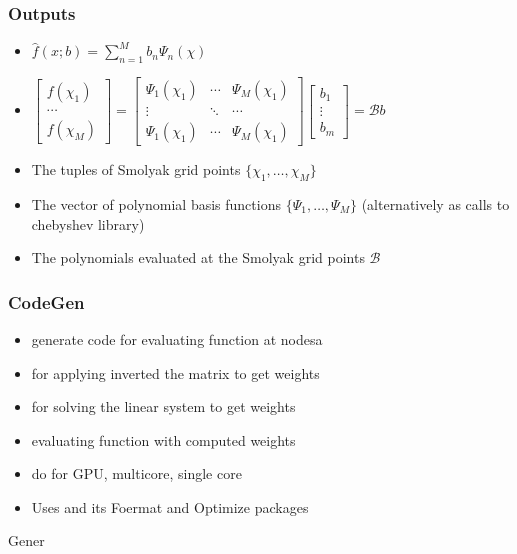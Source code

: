 \documentclass{beamer}
\begin{document}
\begin{frame}
  \frametitle{Outputs}
  \begin{itemize}
  \item $\hat{f}(x;b)=\sum_{n=1}^M b_n \Psi_n(\chi)$
  \item $
    \begin{bmatrix}
      f(\chi_1)\\ \cdots \\       f(\chi_M)
    \end{bmatrix}=
      \begin{bmatrix}
        \Psi_1(\chi_1) &\cdots &        \Psi_M(\chi_1)\\
\vdots&\ddots&\cdots\\
        \Psi_1(\chi_1)& \cdots   &      \Psi_M(\chi_1)
      \end{bmatrix}
      \begin{bmatrix}
        b_1\\ \vdots \\ b_m
      \end{bmatrix}= \mathcal{B} b
$
  \item The tuples of Smolyak grid points $\{\chi_1, \ldots , \chi_M\}$
  \item The vector of polynomial basis functions $\{\Psi_1, \ldots , \Psi_M\}$ (alternatively as calls to chebyshev library)
  \item The polynomials evaluated at the Smolyak grid points $\mathcal{B}$
  \end{itemize}
\end{frame}
\begin{frame}
  \frametitle{CodeGen}
  \begin{itemize}
  \item generate code for evaluating function at nodesa
  \item for applying inverted the matrix to get weights 
  \item for solving the linear system to get weights
  \item evaluating function with computed weights
  \item do for GPU, multicore, single core
  \item Uses \mma  and  its Foermat and Optimize packages
  \end{itemize}
  Gener
\end{frame}
\end{document}

